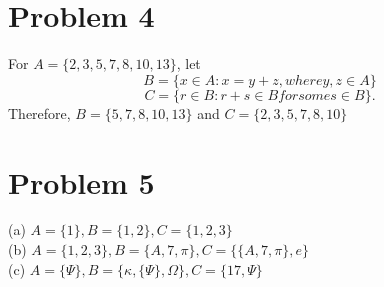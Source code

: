 \documentclass[11pt]{article}
\begin{document}
\pagebreak

\section*{Problem 4}

For $ A = \{2,3,5,7,8,10,13\} $, let
    $$ B = \{x \in A : x=y+z, where y,z \in A\} $$
    $$ C = \{r \in B : r + s \in B for some s \in B\}. $$
Therefore, 
$B =  \{5, 7, 8, 10, 13\}$ and $C =  \{2, 3, 5, 7, 8, 10\}$ \\


\section*{Problem 5}

(a) $ A = \{1\}, B = \{1,2\}, C = \{1,2,3\} $ \\
(b) $ A = \{1,2,3\}, B = \{A, 7, \pi\}, C = \{\{A, 7, \pi\}, e\} $ \\
(c) $ A = \{\Psi\}, B = \{\kappa, \{\Psi\}, \Omega\}, C = \{17, \Psi\} $
\end{document}
